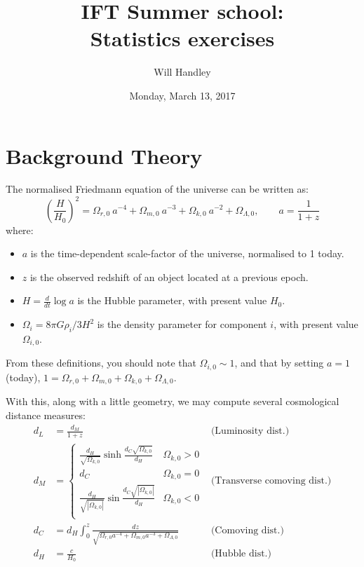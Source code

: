 \documentclass{article}
\title{IFT Summer school:\\
Statistics exercises}
\author{Will Handley}
\date{Monday, March 13, 2017}
\begin{document}
\maketitle


\section*{Background Theory}

The normalised Friedmann equation of the universe can be written as:
\begin{equation}
    {\left( \frac{H}{H_0} \right)}^2 = \Omega_{r,0}\: a^{-4} + \Omega_{m,0}\: a^{-3} + \Omega_{k,0}\: a^{-2} + \Omega_{\Lambda,0}, \qquad a = \frac{1}{1+z}
    \label{eqn:friedmann}
\end{equation}
where:
\begin{itemize}
    \item $a$ is the time-dependent scale-factor of the universe, normalised to 1 today.
    \item $z$ is the observed redshift of an object located at a previous epoch.
    \item $H=\frac{d}{dt}\log a$ is the Hubble parameter, with present value $H_0$.
    \item $\Omega_i = {8\pi G \rho_i}/{3 H^2}$ is the density parameter for component $i$, with present value $\Omega_{i,0}$.
\end{itemize}
From these definitions, you should note that $\Omega_{i,0} \sim 1$, and that by setting $a=1$ (today), $1 = \Omega_{r,0} + \Omega_{m,0} + \Omega_{k,0} + \Omega_{\Lambda,0}$.

With this, along with a little geometry, we may compute several cosmological distance measures:
\begin{align}
    d_L &= \frac{d_M}{1+z} 
    &\text{(Luminosity dist.)}\label{eqn:lum_dis}\\
    d_M &= \left\{
        \begin{array}{lr}
            \frac{d_H}{\sqrt{\Omega_{k,0}}}\sinh{}\frac{d_C\sqrt{\Omega_{k,0}}}{d_H}&\Omega_{k,0}>0\\
        d_C&\Omega_{k,0}=0\\
        \frac{d_H}{\sqrt{|\Omega_{k,0}|}}\sin{}\frac{d_C\sqrt{|\Omega_{k,0}|}}{d_H}&\Omega_{k,0}<0\\
        \end{array}
        \right.
        &\text{(Transverse comoving dist.)}\label{eqn:tra_dis}\\
        d_C &= d_H \int_{0}^{z} \frac{dz}{\sqrt{\Omega_{r,0}a^{-4} + \Omega_{m,0}a^{-3} + \Omega_{\Lambda,0}}}
    &\text{(Comoving dist.)}\label{eqn:com_dis}\\
    d_H &= \frac{c}{H_0}
    &\text{(Hubble dist.)}\label{eqn:hub_dis}
\end{align}
\end{document}
